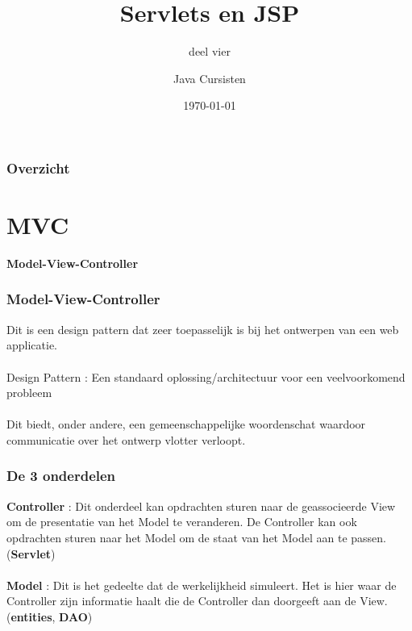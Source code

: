\documentclass{beamer}
\title{Servlets en JSP}
\subtitle{deel vier}
\author{Java Cursisten}
\institute{INTEC Brussel}
\date{\today}
\begin{document}
\begin{frame}

\titlepage

\end{frame}


\begin{frame}

\frametitle{Overzicht}
{\LARGE \tableofcontents}

\end{frame}


\section{MVC}


\begin{frame}

\begin{center}
\textbf{{\Huge \textbf{M}odel-\textbf{V}iew-\textbf{C}ontroller}}
\end{center}

\end{frame}


\begin{frame}

\frametitle{\textbf{M}odel-\textbf{V}iew-\textbf{C}ontroller}

{\Large Dit is een design pattern dat zeer toepasselijk is bij
het ontwerpen van een web applicatie.\\~\\

Design Pattern : Een standaard oplossing/architectuur voor een veelvoorkomend probleem\\~\\

Dit biedt, onder andere, een gemeenschappelijke woordenschat waardoor communicatie over het ontwerp vlotter verloopt.}

\end{frame}

\begin{frame}

\frametitle{De 3 onderdelen}

{\Large \textbf{Controller} : Dit onderdeel kan opdrachten sturen naar de geassocieerde View om de presentatie van het Model te veranderen. De Controller kan ook opdrachten sturen naar het Model om de staat van het Model aan te passen. (\textbf{Servlet})\\~\\

\textbf{Model} : Dit is het gedeelte dat de werkelijkheid simuleert. Het is hier waar de Controller zijn informatie haalt die de Controller dan doorgeeft aan de View. (\textbf{entities}, \textbf{DAO})\\~\\}

\end{frame}
\end{document}
